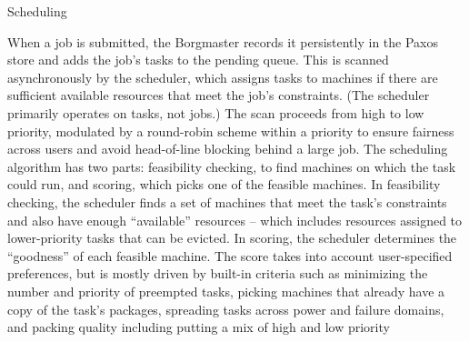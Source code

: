 Scheduling

When a job is submitted, the Borgmaster records it persistently in the Paxos store and adds the job’s tasks to the pending queue. This is scanned asynchronously by the scheduler,
which assigns tasks to machines if there are sufficient available resources that meet the job’s constraints. (The scheduler primarily operates on tasks, not jobs.) The scan proceeds from high to low priority, modulated by a round-robin
scheme within a priority to ensure fairness across users and
avoid head-of-line blocking behind a large job. The scheduling algorithm has two parts: feasibility checking, to find machines on which the task could run, and scoring, which picks
one of the feasible machines.
In feasibility checking, the scheduler finds a set of machines that meet the task’s constraints and also have enough
“available” resources – which includes resources assigned
to lower-priority tasks that can be evicted. In scoring, the
scheduler determines the “goodness” of each feasible machine. The score takes into account user-specified preferences, but is mostly driven by built-in criteria such as minimizing the number and priority of preempted tasks, picking
machines that already have a copy of the task’s packages,
spreading tasks across power and failure domains, and packing quality including putting a mix of high and low priority


